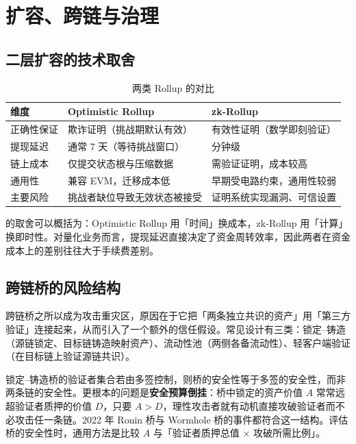 \section{扩容、跨链与治理}

\subsection{二层扩容的技术取舍}

\begin{table}[htbp]
\centering
\caption{两类 Rollup 的对比}\label{tab:03-rollup}
\tablefont
\begin{tabular}{@{}lL{4.4cm}L{5.4cm}@{}}
\toprule
维度 & Optimistic Rollup & zk-Rollup \\
\midrule
正确性保证 & 欺诈证明（挑战期默认有效） & 有效性证明（数学即刻验证） \\
提现延迟 & 通常 7 天（等待挑战窗口） & 分钟级 \\
链上成本 & 仅提交状态根与压缩数据 & 需验证证明，成本较高 \\
通用性 & 兼容 EVM，迁移成本低 & 早期受电路约束，通用性较弱 \\
主要风险 & 挑战者缺位导致无效状态被接受 & 证明系统实现漏洞、可信设置 \\
\bottomrule
\end{tabular}
\end{table}

的取舍可以概括为：Optimistic Rollup 用「时间」换成本，zk-Rollup 用「计算」换即时性。对量化业务而言，提现延迟直接决定了资金周转效率，因此两者在资金成本上的差别往往大于手续费差别。

\subsection{跨链桥的风险结构}

跨链桥之所以成为攻击重灾区，原因在于它把「两条独立共识的资产」用「第三方验证」连接起来，从而引入了一个额外的信任假设。常见设计有三类：锁定--铸造（源链锁定、目标链铸造映射资产）、流动性池（两侧各备流动性）、轻客户端验证（在目标链上验证源链共识）。

\begin{warningbox}
锁定--铸造桥的验证者集合若由多签控制，则桥的安全性等于多签的安全性，而非两条链的安全性。更根本的问题是\textbf{安全预算倒挂}：桥中锁定的资产价值 $A$ 常常远超验证者质押的价值 $D$，只要 $A>D$，理性攻击者就有动机直接攻破验证者而不必攻击任一条链。2022 年 Ronin 桥与 Wormhole 桥的事件都符合这一结构。评估桥的安全性时，通用方法是比较 $A$ 与「验证者质押总值 $\times$ 攻破所需比例」。
\end{warningbox}

